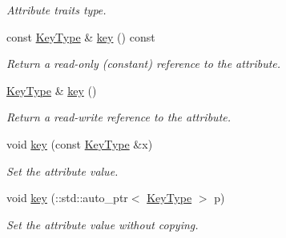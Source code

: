 \begin{DoxyCompactItemize}
\begin{DoxyCompactList}\small\item\em Attribute traits type. \item\end{DoxyCompactList}\item 
const \hyperlink{classopenstack_1_1xml_1_1MetadataKey}{KeyType} \& \hyperlink{classopenstack_1_1xml_1_1MetadataItem_a85d489e648918746ae330291e15db3e7}{key} () const 
\begin{DoxyCompactList}\small\item\em Return a read-\/only (constant) reference to the attribute. \item\end{DoxyCompactList}\item 
\hyperlink{classopenstack_1_1xml_1_1MetadataKey}{KeyType} \& \hyperlink{classopenstack_1_1xml_1_1MetadataItem_af7d0882aa89b1d3daed97fdbcd858272}{key} ()
\begin{DoxyCompactList}\small\item\em Return a read-\/write reference to the attribute. \item\end{DoxyCompactList}\item 
void \hyperlink{classopenstack_1_1xml_1_1MetadataItem_ac5798876d650df271e79e9048d4743fe}{key} (const \hyperlink{classopenstack_1_1xml_1_1MetadataKey}{KeyType} \&x)
\begin{DoxyCompactList}\small\item\em Set the attribute value. \item\end{DoxyCompactList}\item 
void \hyperlink{classopenstack_1_1xml_1_1MetadataItem_a045480a4852eb2c40348e29a879ddf66}{key} (::std::auto\_\-ptr$<$ \hyperlink{classopenstack_1_1xml_1_1MetadataKey}{KeyType} $>$ p)
\begin{DoxyCompactList}\small\item\em Set the attribute value without copying. \item\end{DoxyCompactList}\end{DoxyCompactItemize}
